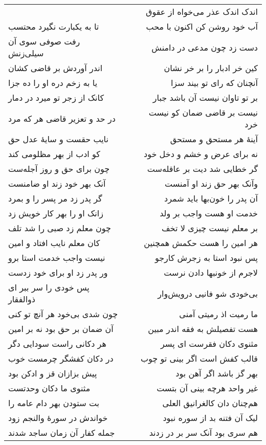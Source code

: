 \begin{center}
\begin{longtable}{l p{0.5cm} r}
&&
اندک اندک عذر می‌خواه از عقوق
\\
تا به یکبارت نگیرد محتسب
&&
آب خود روشن کن اکنون با محب
\\
رفت صوفی سوی آن سیلی‌زنش
&&
دست زد چون مدعی در دامنش
\\
اندر آوردش بر قاضی کشان
&&
کین خر ادبار را بر خر نشان
\\
یا به زخم دره او را ده جزا
&&
آنچنان که رای تو بیند سزا
\\
کانک از زجر تو میرد در دمار
&&
بر تو تاوان نیست آن باشد جبار
\\
در حد و تعزیر قاضی هر که مرد
&&
نیست بر قاضی ضمان کو نیست خرد
\\
نایب حقست و سایهٔ عدل حق
&&
آینهٔ هر مستحق و مستحق
\\
کو ادب از بهر مظلومی کند
&&
نه برای عرض و خشم و دخل خود
\\
چون برای حق و روز آجله‌ست
&&
گر خطایی شد دیت بر عاقله‌ست
\\
آنک بهر خود زند او ضامنست
&&
وآنک بهر حق زند او آمنست
\\
گر پدر زد مر پسر را و بمرد
&&
آن پدر را خون‌بها باید شمرد
\\
زانک او را بهر کار خویش زد
&&
خدمت او هست واجب بر ولد
\\
چون معلم زد صبی را شد تلف
&&
بر معلم نیست چیزی لا تخف
\\
کان معلم نایب افتاد و امین
&&
هر امین را هست حکمش همچنین
\\
نیست واجب خدمت استا برو
&&
پس نبود استا به زجرش کارجو
\\
ور پدر زد او برای خود زدست
&&
لاجرم از خونبها دادن نرست
\\
پس خودی را سر ببر ای ذوالفقار
&&
بی‌خودی شو فانیی درویش‌وار
\\
چون شدی بی‌خود هر آنچ تو کنی
&&
ما رمیت اذ رمیتی آمنی
\\
آن ضمان بر حق بود نه بر امین
&&
هست تفصیلش به فقه اندر مبین
\\
هر دکانی راست سودایی دگر
&&
مثنوی دکان فقرست ای پسر
\\
در دکان کفشگر چرمست خوب
&&
قالب کفش است اگر بینی تو چوب
\\
پیش بزازان قز و ادکن بود
&&
بهر گز باشد اگر آهن بود
\\
مثنوی ما دکان وحدتست
&&
غیر واحد هرچه بینی آن بتست
\\
بت ستودن بهر دام عامه را
&&
هم‌چنان دان کالغرانیق العلی
\\
خواندش در سورهٔ والنجم زود
&&
لیک آن فتنه بد از سوره نبود
\\
جمله کفار آن زمان ساجد شدند
&&
هم سری بود آنک سر بر در زدند

\end{longtable}
\end{center}
